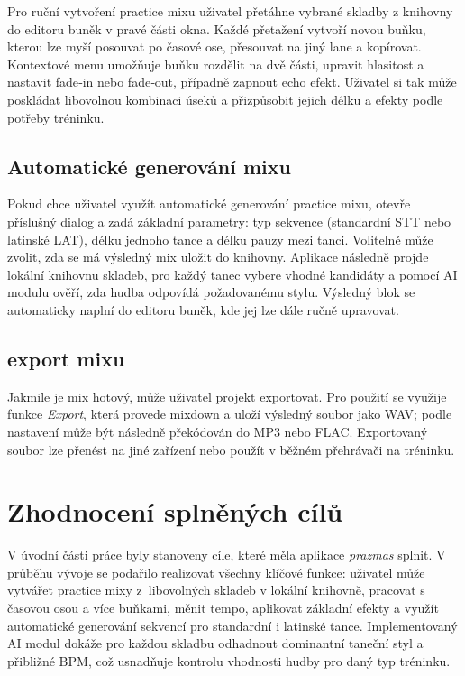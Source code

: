 \documentclass[12pt, a4paper,
]{report}
\begin{document}
Pro ruční vytvoření practice mixu uživatel přetáhne vybrané skladby z knihovny do editoru buněk v pravé části okna. Každé přetažení vytvoří novou buňku, kterou lze myší posouvat po časové ose, přesouvat na jiný lane a kopírovat. Kontextové menu umožňuje buňku rozdělit na dvě části, upravit hlasitost a nastavit fade‑in nebo fade‑out, případně zapnout echo efekt. Uživatel si tak může poskládat libovolnou kombinaci úseků a přizpůsobit jejich délku a efekty podle potřeby tréninku. 

\subsection*{Automatické generování mixu}

Pokud chce uživatel využít automatické generování practice mixu, otevře příslušný dialog a zadá základní parametry: typ sekvence (standardní STT nebo latinské LAT), délku jednoho tance a délku pauzy mezi tanci. Volitelně může zvolit, zda se má výsledný mix uložit do knihovny. Aplikace následně projde lokální knihovnu skladeb, pro každý tanec vybere vhodné kandidáty a pomocí AI modulu ověří, zda hudba odpovídá požadovanému stylu. Výsledný blok se automaticky naplní do editoru buněk, kde jej lze dále ručně upravovat.


\subsection*{export mixu}

Jakmile je mix hotový, může uživatel projekt exportovat. Pro použití se využije funkce \emph{Export}, která provede mixdown a uloží výsledný soubor jako WAV; podle nastavení může být následně překódován do MP3 nebo FLAC. Exportovaný soubor lze přenést na jiné zařízení nebo použít v běžném přehrávači na tréninku.

\section{Zhodnocení splněných cílů}

V úvodní části práce byly stanoveny cíle, které měla aplikace \textit{prazmas} splnit. V průběhu vývoje se podařilo realizovat všechny klíčové funkce: uživatel může vytvářet practice mixy z~libovolných skladeb v lokální knihovně, pracovat s časovou osou a více buňkami, měnit tempo, aplikovat základní efekty a využít automatické generování sekvencí pro standardní i latinské tance. Implementovaný AI modul dokáže pro každou skladbu odhadnout dominantní taneční styl a přibližné BPM, což usnadňuje kontrolu vhodnosti hudby pro daný typ tréninku. 
\end{document}
